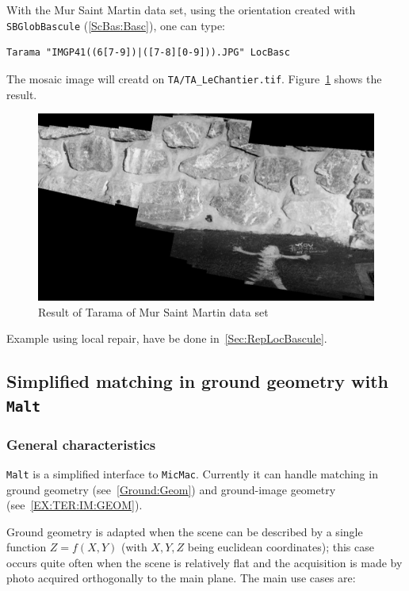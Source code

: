 With the Mur Saint Martin data set,  using the orientation created with
{\tt SBGlobBascule} (\ref{ScBas:Basc}), one can type:

\begin{verbatim}
Tarama "IMGP41((6[7-9])|([7-8][0-9])).JPG" LocBasc
\end{verbatim}

The mosaic image will creatd on {\tt TA/TA\_LeChantier.tif}.
Figure~\ref{FIG:Rectif:StMartin} shows the result.


\begin{figure}
\begin{center}
\includegraphics[width=120mm]{FIGS/MurSaintMartin/TA_LeChantier.jpg}
\end{center}
\caption{Result of Tarama of Mur Saint Martin data set}
\label{FIG:Rectif:StMartin}
\end{figure}


Example using local repair, have be done in~\ref{Sec:RepLocBascule}.



\subsection{Simplified matching in ground geometry with {\tt Malt}}

\subsubsection{General characteristics}

{\tt Malt} is a simplified  interface to  {\tt MicMac}. Currently it can
handle matching in ground geometry (see~\ref{Ground:Geom}) and
ground-image geometry (see~\ref{EX:TER:IM:GEOM}).


Ground geometry is adapted
when the scene can be described by a single function $Z=f(X,Y)$ (with $X,Y,Z$
being euclidean coordinates); this case occurs quite often when the
scene is relatively flat and the acquisition is made by photo acquired
orthogonally to the main plane. The main use cases are:

